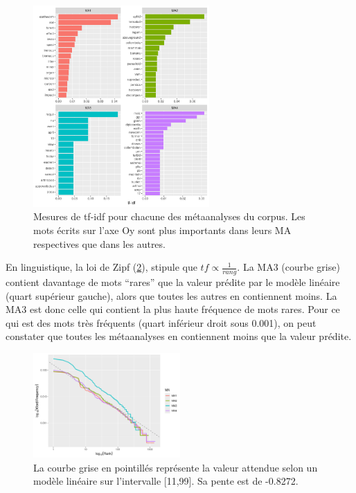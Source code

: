 \documentclass{book}
\begin{document}
\begin{figure}[htb] %
    \begin{center} %
        \includegraphics[width=0.6\textwidth]{graphe_tf_idf.png}
        \caption[Mesures de tf-idf pour chacune des métaanalyses du corpus.]{Mesures de tf-idf pour chacune des métaanalyses du corpus. Les mots écrits sur l'axe Oy sont plus importants dans leurs MA respectives que dans les autres.\label{graph_tf_idf}}
    \end{center}  
\end{figure}

\newpage
En linguistique, la loi de Zipf (\cref{zipf}), stipule que
$tf \propto \frac{1}{rang}$. La MA3 (courbe grise) contient davantage de mots “rares” que la valeur prédite par le modèle linéaire (quart supérieur gauche), alors que toutes les autres en contiennent moins. La MA3 est donc celle qui contient la plus haute fréquence de mots rares. Pour ce qui est des mots très fréquents (quart inférieur droit sous 0.001), on peut constater que toutes les métaanalyses en contiennent moins que la valeur prédite.

\begin{figure}[htb] %
    \begin{center} %
        \includegraphics[width=0.5\textwidth]{curve_zipf.png}
        \caption[Loi de Zipf pour les abstracts du corpus]{La courbe grise en pointillés représente la valeur attendue selon un modèle linéaire sur l'intervalle [11,99]. Sa pente est de -0.8272.\label{zipf}}
    \end{center}  
\end{figure}
\FloatBarrier{}
\end{document}
